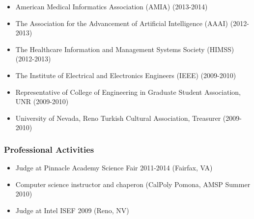 \documentclass[11pt, letter]{article}
\begin{document}
\begin{raggedright}
\begin{itemize}
\itemsep1pt\parskip0pt
\item
  American Medical Informatics Association (AMIA) (2013-2014)
\item
  The Association for the Advancement of Artificial Intelligence (AAAI)
  (2012-2013)
\item
  The Healthcare Information and Management Systems Society (HIMSS)
  (2012-2013)
\item
  The Institute of Electrical and Electronics Engineers (IEEE)
  (2009-2010)
\item
  Representative of College of Engineering in Graduate Student
  Association, UNR (2009-2010)
\item
  University of Nevada, Reno Turkish Cultural Association, Treasurer
  (2009-2010)
\end{itemize}

\subsubsection{Professional Activities}\label{professional-activities}

\begin{itemize}
\itemsep1pt\parskip0pt
\item
  Judge at Pinnacle Academy Science Fair 2011-2014 (Fairfax, VA)
\item
  Computer science instructor and chaperon (CalPoly Pomona, AMSP Summer
  2010)
\item
  Judge at Intel ISEF 2009 (Reno, NV)
\end{itemize}



\end{raggedright}
\end{document}
